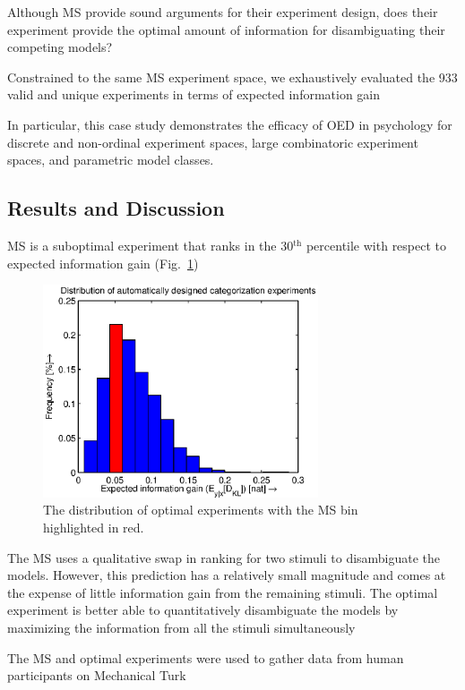 \documentclass[11pt]{article}
\begin{document}
Although MS provide sound arguments for their experiment design, does their experiment provide the optimal amount of information for disambiguating their competing models?

Constrained to the same MS experiment space, we exhaustively evaluated the 933 valid and unique experiments in terms of expected information gain

In particular, this case study demonstrates the efficacy of OED in psychology for discrete and non-ordinal experiment spaces, large combinatoric experiment spaces, and parametric model classes. 

\subsection{Results and Discussion}

MS is a suboptimal experiment that ranks in the 30$^\text{th}$ percentile with respect to expected information gain (Fig.~\ref{fig:dist})
\begin{figure}[h!]
\centering
\includegraphics[width=3.2in]{img/dist.eps}
\caption{The distribution of optimal experiments with the MS bin highlighted in red.}
\label{fig:dist}
\end{figure}

The MS uses a qualitative swap in ranking for two stimuli to disambiguate the models. However, this prediction has a relatively small magnitude and comes at the expense of little information gain from the remaining stimuli. The optimal experiment is better able to quantitatively disambiguate the models by maximizing the information from all the stimuli simultaneously

The MS and optimal experiments were used to gather data from human participants on Mechanical Turk
\end{document}

